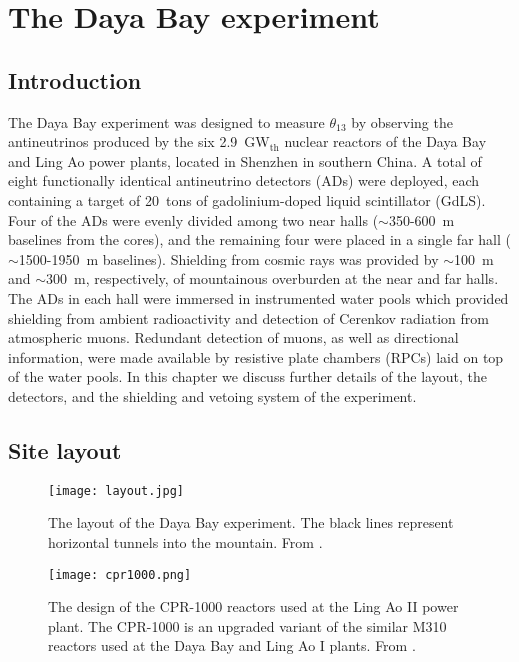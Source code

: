 \documentclass[../thesis.tex]{subfiles}
\begin{document}
\chapter{The Daya Bay experiment}
\label{chap:experim}

\section*{Introduction}

The Daya Bay experiment was designed to measure $\theta_{13}$ by observing the antineutrinos produced by the six 2.9~GW$_{\text{th}}$ nuclear reactors of the Daya Bay and Ling Ao power plants, located in Shenzhen in southern China. A total of eight functionally identical antineutrino detectors (ADs) were deployed, each containing a target of 20~tons of gadolinium-doped liquid scintillator (GdLS). Four of the ADs were evenly divided among two near halls ($\sim$350-600~m baselines from the cores), and the remaining four were placed in a single far hall ($\sim$1500-1950~m baselines). Shielding from cosmic rays was provided by $\sim$100~m and $\sim$300~m, respectively, of mountainous overburden at the near and far halls. The ADs in each hall were immersed in instrumented water pools which provided shielding from ambient radioactivity and detection of Cerenkov radiation from atmospheric muons. Redundant detection of muons, as well as directional information, were made available by resistive plate chambers (RPCs) laid on top of the water pools. In this chapter we discuss further details of the layout, the detectors, and the shielding and vetoing system of the experiment.

\section{Site layout}
\label{sec:expLayout}

\begin{figure}[ht]
  \texttt{[image: layout.jpg]}
  \caption{The layout of the Daya Bay experiment. The black lines represent horizontal tunnels into the mountain. From \cite{SideBySide}.}
  \label{fig:layout} 
\end{figure}

\begin{figure}[ht]
  \texttt{[image: cpr1000.png]}
  \caption{The design of the CPR-1000 reactors used at the Ling Ao II power plant. The CPR-1000 is an upgraded variant of the similar M310 reactors used at the Daya Bay and Ling Ao I plants. From \cite{cpr1000}.}
  \label{fig:cpr1000} 
\end{figure}
\end{document}
